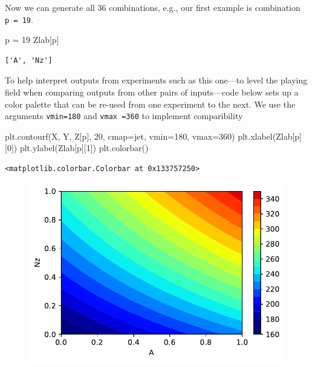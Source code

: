 \documentclass[
  letterpaper,
  DIV=11,
  numbers=noendperiod]{scrreprt}
\newenvironment{Shaded}{\begin{snugshade}}{\end{snugshade}}
\newcommand{\DecValTok}[1]{\textcolor[rgb]{0.68,0.00,0.00}{#1}}
\newcommand{\NormalTok}[1]{\textcolor[rgb]{0.00,0.23,0.31}{#1}}
\newcommand{\OperatorTok}[1]{\textcolor[rgb]{0.37,0.37,0.37}{#1}}
\newcommand{\StringTok}[1]{\textcolor[rgb]{0.13,0.47,0.30}{#1}}
\begin{document}
Now we can generate all 36 combinations, e.g., our first example is
combination \texttt{p\ =\ 19}.

\begin{Shaded}
\begin{Highlighting}[]
\NormalTok{p }\OperatorTok{=} \DecValTok{19}
\NormalTok{Zlab[p]}
\end{Highlighting}
\end{Shaded}

\begin{verbatim}
['A', 'Nz']
\end{verbatim}

To help interpret outputs from experiments such as this one---to level
the playing field when comparing outputs from other pairs of
inputs---code below sets up a color palette that can be re-used from one
experiment to the next. We use the arguments \texttt{vmin=180} and
\texttt{vmax\ =360} to implement comparibility

\begin{Shaded}
\begin{Highlighting}[]
\NormalTok{plt.contourf(X, Y, Z[p], }\DecValTok{20}\NormalTok{, cmap}\OperatorTok{=}\StringTok{\textquotesingle{}jet\textquotesingle{}}\NormalTok{, vmin}\OperatorTok{=}\DecValTok{180}\NormalTok{, vmax}\OperatorTok{=}\DecValTok{360}\NormalTok{)}
\NormalTok{plt.xlabel(Zlab[p][}\DecValTok{0}\NormalTok{])}
\NormalTok{plt.ylabel(Zlab[p][}\DecValTok{1}\NormalTok{])}
\NormalTok{plt.colorbar()}
\end{Highlighting}
\end{Shaded}

\begin{verbatim}
<matplotlib.colorbar.Colorbar at 0x133757250>
\end{verbatim}

\begin{figure}[H]

{\centering \includegraphics{002_awwe_files/figure-pdf/cell-11-output-2.pdf}

}

\end{figure}
\end{document}
